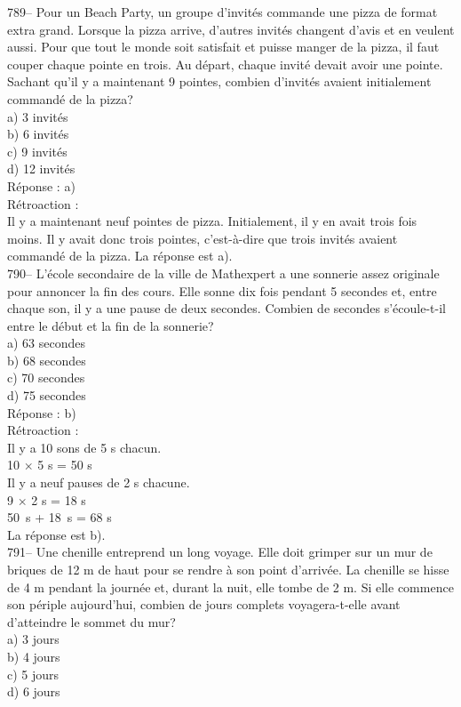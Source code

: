 ﻿\documentclass[letterpaper, 12pt]{article}
\begin{document}
789-- Pour un \og Beach Party\fg , un groupe d'invit\'es commande
une pizza de format extra grand.  Lorsque la pizza arrive, d'autres
invit\'es changent d'avis et en veulent aussi.  Pour que tout le
monde soit satisfait et puisse manger de la pizza, il faut couper
chaque pointe en trois.  Au d\'epart, chaque invit\'e devait avoir
une pointe.  Sachant qu'il y a maintenant 9
pointes, combien d'invit\'es avaient initialement command\'e de la pizza?\\
a) 3 invit\'es\\
b) 6 invit\'es\\
c) 9 invit\'es\\
d) 12 invit\'es\\

R\'eponse : a)\\

R\'etroaction : \\
Il y a maintenant neuf pointes de pizza.  Initialement, il y en avait trois
fois moins.  Il y avait donc trois pointes, c'est-\`a-dire que trois
invit\'es avaient command\'e de la pizza.  La r\'eponse est a).\\

790-- L'\'ecole secondaire de la ville de Mathexpert a une sonnerie assez
originale pour annoncer la fin des cours.  Elle sonne dix fois pendant 5
secondes et, entre chaque son, il y a une pause de deux secondes.  Combien
de secondes s'\'ecoule-t-il entre le d\'ebut et la fin de la sonnerie?\\
a) 63 secondes\\
b) 68 secondes\\
c) 70 secondes\\
d) 75 secondes\\

R\'eponse : b)\\

R\'etroaction : \\
Il y a 10 sons de 5 s chacun.\\
10 $\times$ 5 s  = 50 s \\
Il y a neuf pauses de 2 s chacune.\\
9 $\times$ 2 s = 18 s \\
50~s + 18~s = 68 s\\
La r\'eponse est b).\\

791-- Une chenille entreprend un long voyage.  Elle doit grimper sur un mur
de briques de 12 m de haut pour se rendre \`a son point d'arriv\'ee.  La
chenille se hisse de 4 m pendant la journ\'ee et, durant la nuit, elle tombe
de 2 m.  Si elle commence son p\'eriple aujourd'hui, combien de jours
complets voyagera-t-elle avant d'atteindre le sommet du mur?\\
a) 3 jours\\
b) 4 jours\\
c) 5 jours\\
d) 6 jours\\
\end{document}

